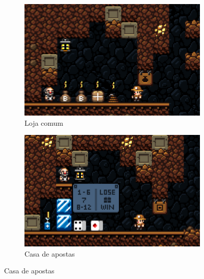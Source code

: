 \begin{figure}[htb!]
\centering
	\begin{subfigure}[b]{0.4\textwidth}
		\includegraphics[width=\textwidth]{fig/spelunky-shop-normal.pdf}
		\caption{Loja comum}
		\label{fig:spelunky-shop-normal}
	\end{subfigure}
	\begin{subfigure}[b]{0.4\textwidth}
		\includegraphics[width=\textwidth]{fig/spelunky-shop-gamble.pdf}
		\caption{Casa de apostas}
		\label{fig:spelunky-shop-gamble}
	\end{subfigure}


\end{figure}

